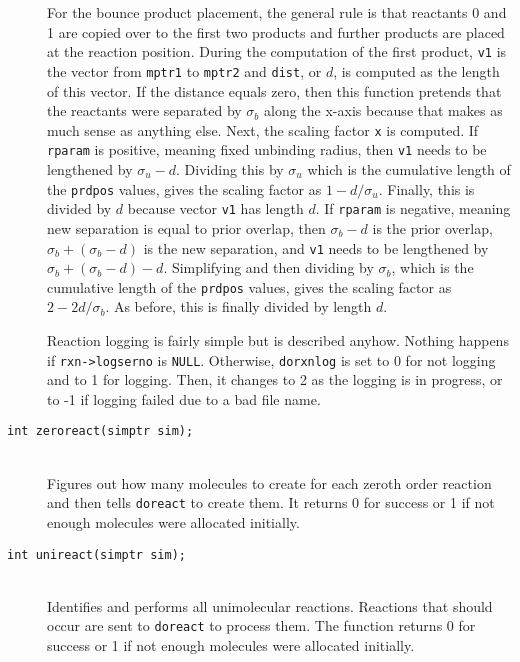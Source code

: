 \documentclass {book}
\begin{document}
\begin{description}
For the bounce product placement, the general rule is that reactants 0 and 1 are copied over to the first two products and further products are placed at the reaction position.  During the computation of the first product, \texttt{v1} is the vector from \texttt{mptr1} to \texttt{mptr2} and \texttt{dist}, or $d$, is computed as the length of this vector.  If the distance equals zero, then this function pretends that the reactants were separated by $\sigma_b$ along the x-axis because that makes as much sense as anything else.  Next, the scaling factor \texttt{x} is computed.  If \texttt{rparam} is positive, meaning fixed unbinding radius, then \texttt{v1} needs to be lengthened by $\sigma_u-d$.  Dividing this by $\sigma_u$ which is the cumulative length of the \texttt{prdpos} values, gives the scaling factor as $1-d/\sigma_u$.  Finally, this is divided by $d$ because vector \texttt{v1} has length $d$.  If \texttt{rparam} is negative, meaning new separation is equal to prior overlap, then $\sigma_b-d$ is the prior overlap, $\sigma_b+(\sigma_b-d)$ is the new separation, and \texttt{v1} needs to be lengthened by $\sigma_b+(\sigma_b-d)-d$.  Simplifying and then dividing by $\sigma_b$, which is the cumulative length of the \texttt{prdpos} values, gives the scaling factor as $2-2d/\sigma_b$.  As before, this is finally divided by length $d$.

Reaction logging is fairly simple but is described anyhow.  Nothing happens if \texttt{rxn->logserno} is \texttt{NULL}.  Otherwise, \texttt{dorxnlog} is set to 0 for not logging and to 1 for logging.  Then, it changes to 2 as the logging is in progress, or to -1 if logging failed due to a bad file name.

\item[\texttt{int zeroreact(simptr sim);}]
\hfill \\
Figures out how many molecules to create for each zeroth order reaction and then tells \texttt{doreact} to create them.  It returns 0 for success or 1 if not enough molecules were allocated initially.

\item[\texttt{int unireact(simptr sim);}]
\hfill \\
Identifies and performs all unimolecular reactions.  Reactions that should occur are sent to \texttt{doreact} to process them.  The function returns 0 for success or 1 if not enough molecules were allocated initially.


\end{description}
\end{document}
